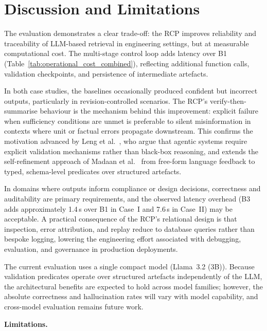 \documentclass[largeformat]{interact}
\begin{document}
\section{Discussion and Limitations}
\label{sec:Discussion}
The evaluation demonstrates a clear trade-off: the RCP improves reliability and traceability of LLM-based retrieval in engineering settings, but at measurable computational cost. The multi-stage control loop adds latency over B1 (Table~\ref{tab:operational_cost_combined}), reflecting additional function calls, validation checkpoints, and persistence of intermediate artefacts.

In both case studies, the baselines occasionally produced confident but incorrect outputs, particularly in revision-controlled scenarios. The RCP's verify-then-summarise behaviour is the mechanism behind this improvement: explicit failure when sufficiency conditions are unmet is preferable to silent misinformation in contexts where unit or factual errors propagate downstream. This confirms the motivation advanced by Leng et al.~\cite{leng2026}, who argue that agentic systems require explicit validation mechanisms rather than black-box reasoning, and extends the self-refinement approach of Madaan et al.~\cite{madaan2023selfrefine} from free-form language feedback to typed, schema-level predicates over structured artefacts.

In domains where outputs inform compliance or design decisions, correctness and auditability are primary requirements, and the observed latency overhead (B3 adds approximately 1.4\,s over B1 in Case~I and 7.6\,s in Case~II) may be acceptable. A practical consequence of the RCP's relational design is that inspection, error attribution, and replay reduce to database queries rather than bespoke logging, lowering the engineering effort associated with debugging, evaluation, and governance in production deployments.

The current evaluation uses a single compact model (Llama~3.2 (3B)). Because validation predicates operate over structured artefacts independently of the LLM, the architectural benefits are expected to hold across model families; however, the absolute correctness and hallucination rates will vary with model capability, and cross-model evaluation remains future work.

\vspace{1.0em}
\noindent \textbf{Limitations.}
\end{document}

